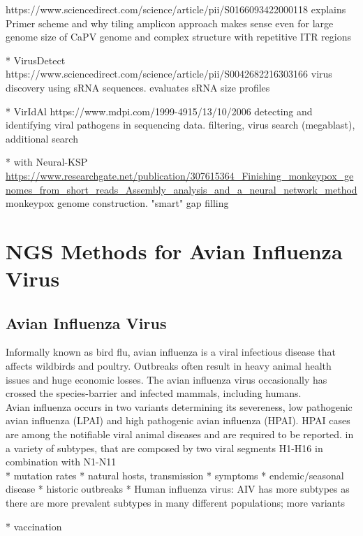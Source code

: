https://www.sciencedirect.com/science/article/pii/S0166093422000118 explains Primer scheme and why tiling amplicon approach makes sense even for large genome size of CaPV genome and complex structure with repetitive ITR regions

* VirusDetect https://www.sciencedirect.com/science/article/pii/S0042682216303166
virus discovery using sRNA sequences. evaluates sRNA size profiles

* VirIdAl https://www.mdpi.com/1999-4915/13/10/2006
detecting and identifying viral pathogens in sequencing data. filtering, virus search (megablast), additional search

* with Neural-KSP \url{https://www.researchgate.net/publication/307615364_Finishing_monkeypox_genomes_from_short_reads_Assembly_analysis_and_a_neural_network_method}
monkeypox genome construction. "smart" gap filling


\section{NGS Methods for Avian Influenza Virus}\label{sec:AIV}
\subsection{Avian Influenza Virus}
Informally known as bird flu, avian influenza is a viral infectious disease that affects wildbirds and poultry. Outbreaks often result in heavy animal health issues and huge economic losses. The avian influenza virus occasionally has crossed the species-barrier and infected mammals, including humans. \\
Avian influenza occurs in two variants determining its severeness, low pathogenic avian influenza (LPAI) and high pathogenic avian influenza (HPAI). HPAI cases are among the notifiable viral animal diseases and are required to be reported.
 in a variety of subtypes, that are composed by two viral segments H1-H16 in combination with N1-N11 \\

* mutation rates
* natural hosts, transmission
* symptoms
* endemic/seasonal disease
* historic outbreaks
* Human influenza virus:
AIV has more subtypes as there are more prevalent subtypes in many different populations; more variants

* vaccination

